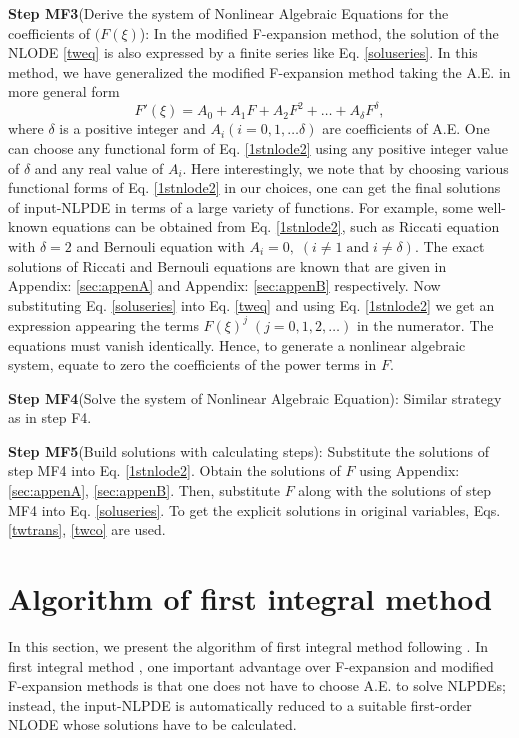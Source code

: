 \documentclass[prd,aps,floats,showkeys,nofootinbib,notitlepage]{revtex4}
\begin{document}
	\textbf{Step MF3}(Derive the system of Nonlinear Algebraic Equations for the coefficients of $(F(\xi)$):
	In the modified F-expansion method, the solution of the NLODE \eqref{tweq} is also expressed by a finite series like Eq. \eqref{soluseries}. In this method, we have generalized the modified F-expansion method \cite{modfexpn} taking the A.E. in more general form
	\begin{equation}\label{1stnlode2}
		F'\left( \xi  \right) = {A_0} + {A_1}F + {A_2}{F^2} +  \ldots + {A_\delta }{F^\delta },
	\end{equation}
	where $\delta$ is a positive integer and $A_i(i=0,1,\ldots \delta)$ are coefficients of A.E. One can choose any functional form of Eq. \eqref{1stnlode2} using any positive integer value of $\delta$ and any real value of $A_i$. Here interestingly, we note that by choosing various functional forms of Eq. \eqref{1stnlode2} in our choices, one can get the final solutions of input-NLPDE in terms of a large variety of functions. For example, some well-known equations can be obtained from Eq. \eqref{1stnlode2}, such as Riccati equation with $\delta=2$ and Bernouli equation with $A_i=0,\;(i\ne 1\; \text{and}\; i \ne \delta)$. The exact solutions of Riccati and Bernouli equations are known that are given in Appendix: \ref{sec:appenA} and Appendix: \ref{sec:appenB} respectively.
	Now substituting Eq. \eqref{soluseries} into Eq. \eqref{tweq} and using Eq. \eqref{1stnlode2} we get an expression appearing the terms $F(\xi)^j\;(j=0,1,2,\ldots)$ in the numerator. The equations must vanish identically. Hence, to generate a nonlinear algebraic system, equate to zero the coefficients of the power terms in $F$.
	
	\textbf{Step MF4}(Solve the system of Nonlinear Algebraic Equation): Similar strategy as in step F4.
	
	\textbf{Step MF5}(Build solutions with calculating steps): Substitute the solutions of step MF4 into Eq. \eqref{1stnlode2}. Obtain the solutions of $F$ using Appendix: \ref{sec:appenA}, \ref{sec:appenB}. Then, substitute $F$ along with the solutions of step MF4 into Eq. \eqref{soluseries}. To get the explicit solutions in original variables, Eqs. \eqref{twtrans}, \eqref{twco} are used.
	
	
	\section{Algorithm of first integral method}\label{sec:fim}
	In this section, we present the algorithm of first integral method following \cite{fim0,fim,mirza,complexTwt1}.
	In first integral method \cite{fim0,fim,mirza,complexTwt1}, one important advantage over F-expansion and modified F-expansion methods is that one does not have to choose A.E. to solve NLPDEs; instead, the input-NLPDE is automatically reduced to a suitable first-order NLODE whose solutions have to be calculated.  
	
\end{document}
